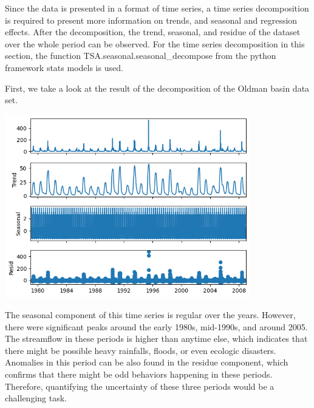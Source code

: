 Since the data is presented in a format of time series, a time series decomposition is required to present more information on trends, and seasonal and regression effects.\cite{time_series} After the decomposition, the trend, seasonal, and residue of the dataset over the whole period can be observed. For the time series decomposition in this section, the function TSA.seasonal.seasonal\_decompose from the python framework stats models is used.\cite{stat_models_decompose}

First, we take a look at the result of the decomposition of the Oldman basin data set.
\begin{center}
\includegraphics[width=0.8\textwidth]{figures/dataset_time_series/Oldman.png}
\end{center}
The seasonal component of this time series is regular over the years. However, there were significant peaks around the early 1980s, mid-1990s, and around 2005. The streamflow in these periods is higher than anytime else, which indicates that there might be possible heavy rainfalls, floods\cite{hydrology}, or even ecologic disasters. Anomalies in this period can be also found in the residue component, which confirms that there might be odd behaviors happening in these periods. Therefore, quantifying the uncertainty of these three periods would be a challenging task.

